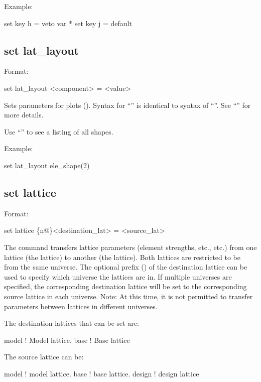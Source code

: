 {{Example:
\begin{example}
  set key h = veto var *
  set key j = default
\end{example}



\subsection{set lat_layout}
\label{s:set.lat.layout}

Format:
\begin{example}
  set lat_layout <component> = <value>
\end{example}

Sets parameters for  plots ().  Syntax for ``'' is
identical to syntax of ``''.  See ``'' for more details.

Use ``'' to see a listing of all shapes. 

Example:
\begin{example}
  set lat_layout ele_shape(2)%
\end{example}


\subsection{set lattice}
\label{s:set.lattice}

Format:
\begin{example}
  set lattice \{n@\}<destination_lat> = <source_lat>
\end{example}

The  command transfers lattice parameters (element strengths, etc., etc.)  from one
lattice (the  lattice) to another (the  lattice). Both lattices are
restricted to be from the same universe. The optional  prefix () of the
destination lattice can be used to specify which universe the lattices are in. If multiple universes
are specified, the corresponding destination lattice will be set to the corresponding source lattice
in each universe. Note: At this time, it is not permitted to transfer parameters between lattices in
different universes.

The destination lattices that can be set are:
\begin{example}
  model      ! Model lattice.
  base       ! Base lattice
\end{example}
The source lattice can be:
\begin{example}
  model       ! model lattice.
  base        ! base lattice.
  design      ! design lattice
\end{example}

}}
